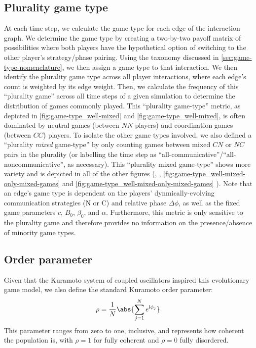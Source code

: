 \documentclass[pdflatex,lineno,referee,sn-nature]{sn-jnl}
\begin{document}
\subsection{Plurality game type}\label{sec:plurality_game_type}
At each time step, we calculate the game type for each edge
of the interaction graph.
We determine the game type by creating a two-by-two payoff matrix of possibilities
where both players have the hypothetical option of switching to the other player's
strategy/phase pairing.
Using the taxonomy discussed in \cref{sec:game-type-nomenclature},
we then assign a game type to that interaction.
We then identify the plurality game type across all player interactions,
where each edge's count is weighted by its edge weight.
Then, we calculate the frequency of this ``plurality game'' across
all time steps of a given simulation to determine the distribution
of games commonly played.
This ``plurality game-type'' metric, as depicted in
\cref{fig:game-type_well-mixed} and \cref{fig:game-type_well-mixed},
is often dominated by neutral games (between $NN$ players)
and coordination games (between $CC$) players.
To isolate the other game types involved,
we also defined a ``plurality \emph{mixed} game-type''
by only counting games between mixed $CN$ or $NC$ pairs in the plurality
(or labelling the time step as ``all-communicative''/``all-noncommunicative'',
as necessary).
This ``plurality mixed game-type'' shows more variety
and is depicted in all of the other figures
(, ,
\cref{fig:game-type_well-mixed-only-mixed-games}
and \cref{fig:game-type_well-mixed-only-mixed-games}
).
Note that an edge's game type is dependent
on the players' dynmically-evolving communication strategies (N or C)
and relative phase $\Delta \phi$,
as well as the fixed game parameters $c$, $B_0$, $\beta_0$, and $\alpha$.
Furthermore, this metric is only sensitive to the
plurality game and therefore provides no information
on the presence/absence of minority game types.

\subsection{Order parameter}
Given that the Kuramoto system of coupled oscillators
inspired this evolutionary game model,
we also define the standard Kuramoto order parameter:
\begin{equation}
  \rho = \frac{1}{N} \abs{\sum_{j=1}^N e^{\im \phi_j}}
  \label{eq:order_parameter}
\end{equation}
This parameter ranges from zero to one, inclusive,
and represents how coherent the population is,
with $\rho = 1$ for fully coherent and $\rho = 0$ fully disordered.
\end{document}
